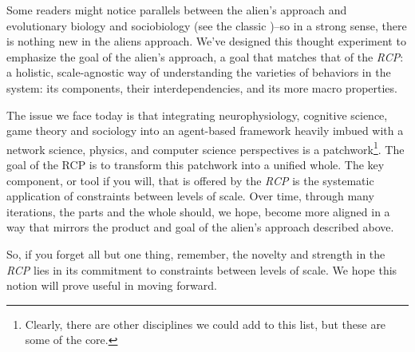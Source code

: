\documentclass{article}
\begin{document}
Some readers might notice parallels between the alien's approach and evolutionary biology and sociobiology (see the classic \cite{wilson2000sociobiology})--so in a strong sense, there is nothing new in the aliens approach.  We've designed this thought experiment to emphasize the goal of the alien's approach, a goal that matches that of the \textit{RCP}:  a holistic, scale-agnostic way of understanding the varieties of behaviors in the system: its components, their interdependencies, and its more macro properties.   

The issue we face today is that integrating neurophysiology, cognitive science, game theory and sociology into an agent-based framework heavily imbued with a network science, physics, and computer science perspectives is a patchwork\footnote{Clearly, there are other disciplines we could add to this list, but these are some of the core.}. The goal of the RCP is to transform this patchwork into a unified whole.  The key component, or tool if you will, that is offered by the \textit{RCP} is the systematic application of constraints between levels of scale.  Over time, through many iterations, the parts and the whole should, we hope, become more aligned in a way that mirrors the product and goal of the alien's approach described above. 

So, if you forget all but one thing, remember, the novelty and strength in the \textit{RCP} lies in its commitment to constraints between levels of scale.  We hope this notion will prove useful in moving forward.

 


\end{document}
